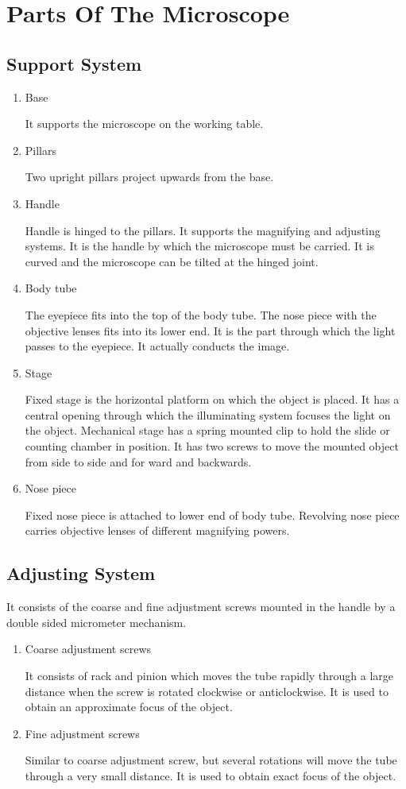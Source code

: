 \documentclass[a4paper,12pt,openany,oneside]{book}
\begin{document}
		\section*{Parts Of The Microscope}

		\subsection*{Support System}
		\begin{enumerate}
			\item{Base \par It supports the microscope on the working table.}
			\item{Pillars \par Two upright pillars project upwards from the base.}
			\item{Handle \par Handle is hinged to the pillars. It supports the magnifying and adjusting systems. It is the handle by which the microscope must be carried. It is curved and the microscope can be tilted at the hinged joint.}
			\item{Body tube \par The eyepiece fits into the top of the body tube. The nose piece with the objective lenses fits into its lower end. It is the part through which the light passes to the eyepiece. It actually conducts the image.}
			\item{Stage \par Fixed stage is the horizontal platform on which the object is placed. It has a central opening through which the illuminating system focuses the light on the object. Mechanical stage has a spring mounted clip to hold the slide or counting chamber in position. It has two screws to move the mounted object from side to side and for ward and backwards.}
			\item {Nose piece \par Fixed nose piece is attached to lower end of body tube. Revolving nose piece carries objective lenses of different magnifying powers.}
		\end{enumerate}

		\subsection*{Adjusting System}
		It consists of the coarse and fine adjustment screws mounted in the handle by a double sided micrometer mechanism.
		\begin{enumerate}
			\item{Coarse adjustment screws \par It consists of rack and pinion which moves the tube rapidly through a large distance when the screw is rotated clockwise or anticlockwise. It is used to obtain an approximate focus of the object.}
			\item{Fine adjustment screws \par Similar to coarse adjustment screw, but several rotations will move the tube through a very small distance. It is used to obtain exact focus of the object.}
		\end{enumerate}
\end{document}
